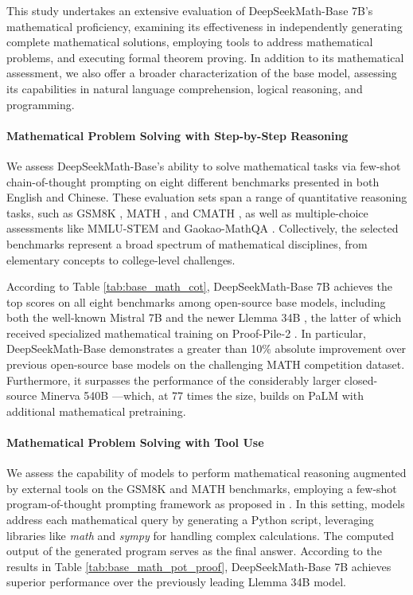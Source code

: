 \begin{itemize}[topsep=0pt]
This study undertakes an extensive evaluation of DeepSeekMath-Base 7B's mathematical proficiency, examining its effectiveness in independently generating complete mathematical solutions, employing tools to address mathematical problems, and executing formal theorem proving. In addition to its mathematical assessment, we also offer a broader characterization of the base model, assessing its capabilities in natural language comprehension, logical reasoning, and programming.

\paragraph{Mathematical Problem Solving with Step-by-Step Reasoning}

We assess DeepSeekMath-Base's ability to solve mathematical tasks via few-shot chain-of-thought prompting \citep{cot} on eight different benchmarks presented in both English and Chinese. These evaluation sets span a range of quantitative reasoning tasks, such as GSM8K \citep{gsm8k}, MATH \citep{MATH}, and CMATH \citep{wei2023cmath}, as well as multiple-choice assessments like MMLU-STEM \citep{mmlu} and Gaokao-MathQA \citep{agieval}. Collectively, the selected benchmarks represent a broad spectrum of mathematical disciplines, from elementary concepts to college-level challenges.

According to Table \ref{tab:base_math_cot}, DeepSeekMath-Base 7B achieves the top scores on all eight benchmarks among open-source base models, including both the well-known Mistral 7B \citep{mistral} and the newer Llemma 34B \citep{llemma}, the latter of which received specialized mathematical training on Proof-Pile-2 \citep{llemma}. In particular, DeepSeekMath-Base demonstrates a greater than 10\% absolute improvement over previous open-source base models on the challenging MATH competition dataset. Furthermore, it surpasses the performance of the considerably larger closed-source Minerva 540B \citep{minerva}—which, at 77 times the size, builds on PaLM \citep{palm} with additional mathematical pretraining.

\paragraph{Mathematical Problem Solving with Tool Use} We assess the capability of models to perform mathematical reasoning augmented by external tools on the GSM8K and MATH benchmarks, employing a few-shot program-of-thought prompting framework as proposed in \citep{pot,pal}. In this setting, models address each mathematical query by generating a Python script, leveraging libraries like \textit{math} and \textit{sympy} for handling complex calculations. The computed output of the generated program serves as the final answer. According to the results in Table \ref{tab:base_math_pot_proof}, DeepSeekMath-Base 7B achieves superior performance over the previously leading Llemma 34B model.


\end{itemize}
